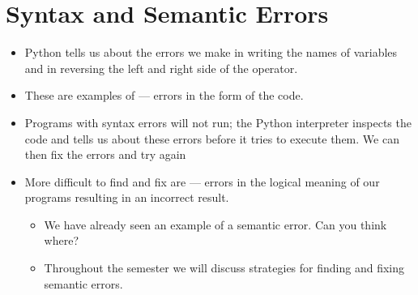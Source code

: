 \documentclass[letterpaper,10pt,english]{sphinxmanual}
\begin{document}
\section{Syntax and Semantic Errors}
\label{\detokenize{lecture_notes/lec02_calculator:syntax-and-semantic-errors}}\begin{itemize}
\item {} 
Python tells us about the errors we make in writing the names of
variables and in reversing the left and right side of the \sphinxcode{\sphinxupquote{=}}
operator.

\item {} 
These are examples of  — errors in the form of the
code.

\item {} 
Programs with syntax errors will not run; the Python interpreter
inspects the code and tells us about these errors before it tries to
execute them. We can then fix the errors and try again

\item {} 
More difficult to find and fix are  — errors in the
logical meaning of our programs resulting in an incorrect result.
\begin{itemize}
\item {} 
We have already seen an example of a semantic error. Can you think
where?

\item {} 
Throughout the semester we will discuss strategies for finding and
fixing semantic errors.

\end{itemize}

\end{itemize}
\end{document}
